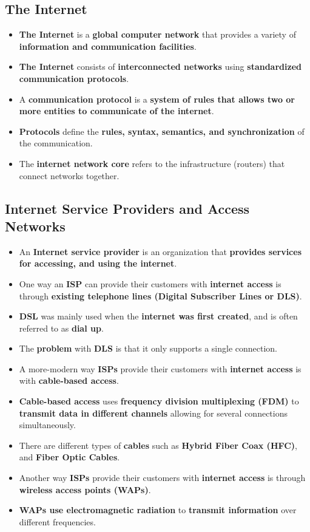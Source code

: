 \documentclass[16pt]{article}
\begin{document}
    \subsection*{The Internet}
    \begin{itemize}
        \item \textbf{The Internet} is a \textbf{global computer network} that provides a variety of \textbf{information and communication facilities}.
        \item \textbf{The Internet} consists of \textbf{interconnected networks} using \textbf{standardized communication protocols}.
        \item A \textbf{communication protocol} is a \textbf{system of rules that allows two or more entities to communicate of the internet}.
        \item \textbf{Protocols} define the \textbf{rules, syntax, semantics, and synchronization} of the communication.
        \item The \textbf{internet network core} refers to the infrastructure (routers) that connect networks together.
   \end{itemize}

   \subsection*{Internet Service Providers and Access Networks}
   \begin{itemize}
       \item An \textbf{Internet service provider} is an organization that \textbf{provides services for accessing, and using the internet}.
       \item One way an \textbf{ISP} can provide their customers with \textbf{internet access} is through \textbf{existing telephone lines (Digital Subscriber Lines or DLS)}.
       \item \textbf{DSL} was mainly used when the \textbf{internet was first created}, and is often referred to as \textbf{dial up}.
       \item The \textbf{problem} with \textbf{DLS} is that it only supports a single connection.
       \item A more-modern way \textbf{ISPs} provide their customers with \textbf{internet access} is with \textbf{cable-based access}.
       \item \textbf{Cable-based access} uses \textbf{frequency division multiplexing (FDM)} to \textbf{transmit data in different channels} allowing for several connections simultaneously.
       \item There are different types of \textbf{cables} such as \textbf{Hybrid Fiber Coax (HFC)}, and \textbf{Fiber Optic Cables}.
       \item Another way \textbf{ISPs} provide their customers with \textbf{internet access} is through \textbf{wireless access points (WAPs)}.
       \item \textbf{WAPs use electromagnetic radiation} to \textbf{transmit information} over different frequencies.
   \end{itemize}
\end{document}
